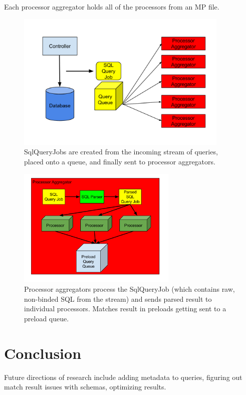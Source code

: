 \documentclass[12pt]{article}
\begin{document}
Each processor aggregator holds all of the processors from an MP file.

\begin{figure}[h]
  \centering
  \includegraphics[width=4in]{figures/eager_db_overview.png}
  \caption{\label{fig:system-overview}SqlQueryJobs are created from the incoming stream of queries, placed onto a queue, and finally sent to processor aggregators.}
\end{figure}

\begin{figure}[h]
  \centering
  \includegraphics[width=3in]{figures/processor_aggregator.png}
  \caption{\label{fig:processor-aggregator}Processor aggregators process the SqlQueryJob (which contains raw, non-binded SQL from the stream) and sends parsed result to individual processors. Matches result in preloads getting sent to a preload queue.}
\end{figure}
\section{Conclusion}

Future directions of research include adding metadata to queries, figuring out match result issues with schemas, optimizing results.
\end{document}
